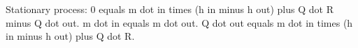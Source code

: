 Stationary process:  
0 equals m dot in times (h in minus h out) plus Q dot R minus Q dot out.  
m dot in equals m dot out.  
Q dot out equals m dot in times (h in minus h out) plus Q dot R.